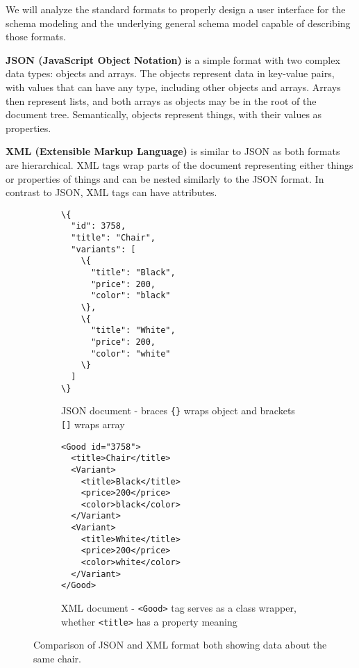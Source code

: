 We will analyze the standard formats to properly design a user interface for the schema modeling and the underlying general schema model capable of describing those formats.

\smallskip

\textbf{JSON (JavaScript Object Notation)} is a simple format with two complex data types: objects and arrays. The objects represent data in key-value pairs, with values that can have any type, including other objects and arrays. Arrays then represent lists, and both arrays as objects may be in the root of the document tree. Semantically, objects represent things, with their values as properties.

\textbf{XML (Extensible Markup Language)} is similar to JSON as both formats are hierarchical. XML tags wrap parts of the document representing either things or properties of things and can be nested similarly to the JSON format. In contrast to JSON, XML tags can have attributes.

\begin{figure}[h!]\centering
    \begin{subfigure}[b]{.45\textwidth}
\begin{Verbatim}[commandchars=\\\{\}]
\{
  "id": 3758,
  "title": "Chair",
  "variants": [
    \{
      "title": "Black",
      "price": 200,
      "color": "black"
    \},
    \{
      "title": "White",
      "price": 200,
      "color": "white"
    \}
  ]
\}
\end{Verbatim}
        \caption{JSON document - braces {\tt\{\}} wraps object and brackets {\tt[]} wraps array}
      \end{subfigure}\hfil%
      \begin{subfigure}[b]{.45\textwidth}
\begin{Verbatim}[commandchars=\\\{\}]
<Good id="3758">
  <title>Chair</title>
  <Variant>
    <title>Black</title>
    <price>200</price>
    <color>black</color>
  </Variant>
  <Variant>
    <title>White</title>
    <price>200</price>
    <color>white</color>
  </Variant>
</Good>
\end{Verbatim}

\vfill

        \caption{XML document - {\tt<Good>} tag serves as a class wrapper, whether {\tt<title>} has a property meaning}
      \end{subfigure}
    \caption{Comparison of JSON and XML format both showing data about the same chair.}
    \label{analysis/xml-json}
\end{figure}


